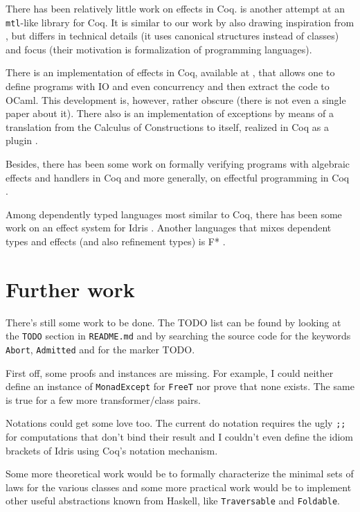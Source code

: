 \documentclass[declaration,inz,english,shortabstract]{iithesis}
\newcommand{\m}[1]{\texttt{#1}}
\begin{document}
There has been relatively little work on effects in Coq. \cite{MERC} is another attempt at an \m{mtl}-like library for Coq. It is similar to our work by also drawing inspiration from \cite{JustDoIt}, but differs in technical details (it uses canonical structures instead of classes) and focus (their motivation is formalization of programming languages).

There is an implementation of effects in Coq, available at \cite{CoqIO}, that allows one to define programs with IO and even concurrency and then extract the code to OCaml. This development is, however, rather obscure (there is not even a single paper about it). There also is an implementation of exceptions by means of a translation from the Calculus of Constructions to itself, realized in Coq as a plugin \cite{FailureIsNotAnOption}.

Besides, there has been some work on formally verifying programs with algebraic effects and handlers in Coq \cite{CoqEff1} \cite{CoqEff2} and more generally, on effectful programming in Coq \cite{CoqEff3}.

Among dependently typed languages most similar to Coq, there has been some work on an effect system for Idris \cite{IdrisEffects}. Another languages that mixes dependent types and effects (and also refinement types) is F* \cite{FStar}.

\section{Further work}

There's still some work to be done. The TODO list can be found by looking at the \m{TODO} section in \m{README.md} and by searching the source code for the keywords \m{Abort}, \m{Admitted} and for the marker TODO.

First off, some proofs and instances are missing. For example, I could neither define an instance of \m{MonadExcept} for \m{FreeT} nor prove that none exists. The same is true for a few more transformer/class pairs.

Notations could get some love too. The current do notation requires the ugly \m{;;} for computations that don't bind their result and I couldn't even define the idiom brackets of Idris using Coq's notation mechanism.

Some more theoretical work would be to formally characterize the minimal sets of laws for the various classes and some more practical work would be to implement other useful abstractions known from Haskell, like \m{Traversable} and \m{Foldable}.
\end{document}

